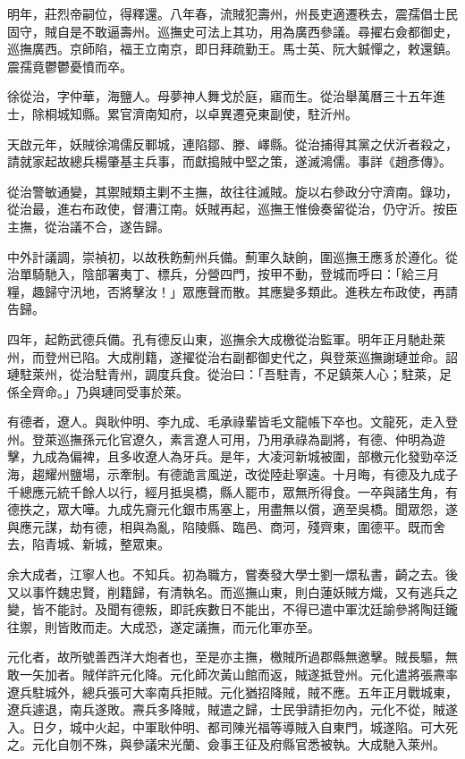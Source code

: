 \begin{pinyinscope}
明年，莊烈帝嗣位，得釋還。八年春，流賊犯壽州，州長吏適遷秩去，震孺倡士民固守，賊自是不敢逼壽州。巡撫史可法上其功，用為廣西參議。尋擢右僉都御史，巡撫廣西。京師陷，福王立南京，即日拜疏勤王。馬士英、阮大鋮憚之，敕還鎮。震孺竟鬱鬱憂憤而卒。

徐從治，字仲華，海鹽人。母夢神人舞戈於庭，寤而生。從治舉萬曆三十五年進士，除桐城知縣。累官濟南知府，以卓異遷兗東副使，駐沂州。

天啟元年，妖賊徐鴻儒反鄆城，連陷鄒、滕、嶧縣。從治捕得其黨之伏沂者殺之，請就家起故總兵楊肇基主兵事，而獻搗賊中堅之策，遂滅鴻儒。事詳《趙彥傳》。

從治警敏通變，其禦賊類主剿不主撫，故往往滅賊。旋以右參政分守濟南。錄功，從治最，進右布政使，督漕江南。妖賊再起，巡撫王惟儉奏留從治，仍守沂。按臣主撫，從治議不合，遂告歸。

中外計議調，崇禎初，以故秩飭薊州兵備。薊軍久缺餉，圍巡撫王應豸於遵化。從治單騎馳入，陰部署夷丁、標兵，分營四門，按甲不動，登城而呼曰：「給三月糧，趣歸守汛地，否將擊汝！」眾應聲而散。其應變多類此。進秩左布政使，再請告歸。

四年，起飭武德兵備。孔有德反山東，巡撫余大成檄從治監軍。明年正月馳赴萊州，而登州已陷。大成削籍，遂擢從治右副都御史代之，與登萊巡撫謝璉並命。詔璉駐萊州，從治駐青州，調度兵食。從治曰：「吾駐青，不足鎮萊人心；駐萊，足係全齊命。」乃與璉同受事於萊。

有德者，遼人。與耿仲明、李九成、毛承祿輩皆毛文龍帳下卒也。文龍死，走入登州。登萊巡撫孫元化官遼久，素言遼人可用，乃用承祿為副將，有德、仲明為遊擊，九成為偏裨，且多收遼人為牙兵。是年，大凌河新城被圍，部檄元化發勁卒泛海，趨耀州鹽場，示牽制。有德詭言風逆，改從陸赴寧遠。十月晦，有德及九成子千總應元統千餘人以行，經月抵吳橋，縣人罷市，眾無所得食。一卒與諸生角，有德抶之，眾大嘩。九成先齎元化銀市馬塞上，用盡無以償，適至吳橋。聞眾怨，遂與應元謀，劫有德，相與為亂，陷陵縣、臨邑、商河，殘齊東，圍德平。既而舍去，陷青城、新城，整眾東。

余大成者，江寧人也。不知兵。初為職方，嘗奏發大學士劉一燝私書，齮之去。後又以事忤魏忠賢，削籍歸，有清執名。而巡撫山東，則白蓮妖賊方熾，又有逃兵之變，皆不能討。及聞有德叛，即託疾數日不能出，不得已遣中軍沈廷諭參將陶廷鑨往禦，則皆敗而走。大成恐，遂定議撫，而元化軍亦至。

元化者，故所號善西洋大炮者也，至是亦主撫，檄賊所過郡縣無邀擊。賊長驅，無敢一矢加者。賊佯許元化降。元化師次黃山館而返，賊遂抵登州。元化遣將張燾率遼兵駐城外，總兵張可大率南兵拒賊。元化猶招降賊，賊不應。五年正月戰城東，遼兵遽退，南兵遂敗。燾兵多降賊，賊遣之歸，士民爭請拒勿內，元化不從，賊遂入。日夕，城中火起，中軍耿仲明、都司陳光福等導賊入自東門，城遂陷。可大死之。元化自刎不殊，與參議宋光蘭、僉事王征及府縣官悉被執。大成馳入萊州。


\end{pinyinscope}

